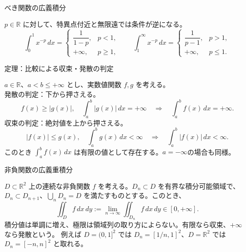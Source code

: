 \documentclass[a4paper,10pt,pdflatex,ja=standard,jafont=ipaex-type1,
  magstyle=real,scale=1]{bxjsarticle}
\newcommand{\topic}[1]{\par\vspace{5pt}%
  {\large\sffamily\mdseries\color{accent}#1}\par\vspace{2pt}}
\newcommand{\examplelabel}[1]{{\sffamily\mdseries\color{ink}#1}}
\begin{document}
\topic{べき関数の広義積分}
$p\in\mathbb R$ に対して、特異点付近と無限遠では条件が逆になる。
$$
 \int_0^1x^{-p}\,dx=
 \begin{cases}\dfrac1{1-p},&p<1,\\+\infty,&p\ge1,\end{cases}
 \qquad
 \int_1^\infty x^{-p}\,dx=
 \begin{cases}\dfrac1{p-1},&p>1,\\+\infty,&p\le1.\end{cases}
$$


\topic{定理：比較による収束・発散の判定}
$a\in\mathbb R$、$a<b\le+\infty$ とし、実数値関数 $f,g$ を考える。\\

\examplelabel{発散の判定：下から押さえる。}
$$
 f(x)\ge |g(x)|,\quad \int_a^b|g(x)|\,dx=+\infty
 \quad\Longrightarrow\quad \int_a^bf(x)\,dx=+\infty.
$$
\examplelabel{収束の判定：絶対値を上から押さえる。}
$$
 |f(x)|\le g(x),\quad \int_a^bg(x)\,dx<\infty
 \quad\Longrightarrow\quad \int_a^b|f(x)|\,dx<\infty.
$$
このとき $\int_a^bf(x)\,dx$ は有限の値として存在する。$a=-\infty$の場合も同様。


\topic{非負関数の広義重積分}
$D\subset\mathbb R^2$ 上の連続な非負関数 $f$ を考える。$D_n\subset D$ を有界な積分可能領域で、
$D_n\subset D_{n+1}$、$\bigcup_nD_n=D$ を満たすものとする。このとき、
$$
 \iint_Df\,dx\,dy:=\lim_{n\to\infty}\iint_{D_n}f\,dx\,dy\in[0,+\infty].
$$
積分値は単調に増え、極限は領域列の取り方によらない。有限なら収束、$+\infty$ なら発散という。
例えば $D=(0,1]^2$ では $D_n=[1/n,1]^2$、$D=\mathbb R^2$ では $D_n=[-n,n]^2$ と取れる。
\end{document}

